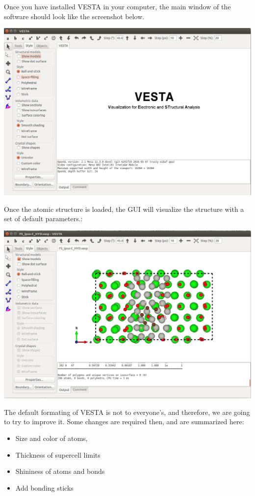 \documentclass[11pt]{article}
\begin{document}
Once you have installed VESTA in your computer, the main window of the software should look like the screenshot below.

\begin{center}
\includegraphics[width=.9\linewidth]{./figures/VESTA/main-window.png}
\end{center}

Once the atomic structure is loaded, the GUI will visualize the structure with a set of default parameters.:

\begin{center}
\includegraphics[width=.9\linewidth]{./figures/VESTA/01_loading_vaspfile.png}
\end{center}

The default formating of VESTA is not to everyone's, and therefore, we are going to try to improve it. Some changes are required then, and are summarized here:

\begin{itemize}
\item Size and color of atoms,
\item Thickness of supercell limits
\item Shininess of atoms and bonds
\item Add bonding sticks
\end{itemize}
\end{document}
